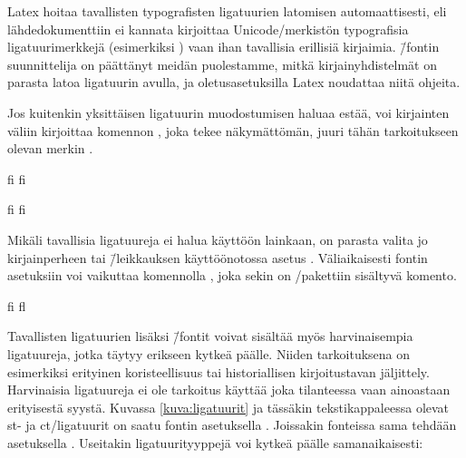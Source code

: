 Latex hoitaa tavallisten typografisten ligatuurien latomisen
automaattisesti, eli lähdedokumenttiin ei kannata kirjoittaa
Unicode\-/merkistön typografisia ligatuurimerkkejä (esimerkiksi
) vaan ihan tavallisia
erillisiä kirjaimia.  \=/fontin suunnittelija on
päättänyt meidän puolestamme, mitkä kirjainyhdistelmät on parasta latoa
ligatuurin avulla, ja oletusasetuksilla Latex noudattaa niitä ohjeita.

Jos kuitenkin yksittäisen ligatuurin muodostumisen haluaa estää, voi
kirjainten väliin kirjoittaa komennon , joka
tekee näkymättömän, juuri tähän tarkoitukseen olevan merkin
.

\begin{koodilohkosis}
  fi f\textcompwordmark i
\end{koodilohkosis}

\begin{tulossis}
  fi f\textcompwordmark i
\end{tulossis}

Mikäli tavallisia ligatuureja ei halua käyttöön lainkaan, on parasta
valita jo kirjainperheen tai \=/leikkauksen käyttöönotossa asetus
. Väliaikaisesti fontin asetuksiin
voi vaikuttaa komennolla , joka sekin on
\-/pakettiin sisältyvä komento.

\begin{koodilohkosis}
  { fi fl}
\end{koodilohkosis}

Tavallisten ligatuurien lisäksi  \=/fontit voivat
sisältää myös harvinaisempia ligatuureja, jotka täytyy erikseen kytkeä
päälle. Niiden tarkoituksena on esimerkiksi erityinen koristeellisuus
tai historiallisen kirjoitustavan jäljittely. Harvinaisia ligatuureja ei
ole tarkoitus käyttää joka tilanteessa vaan ainoastaan erityisestä
syystä. Kuvassa \ref{kuva:ligatuurit} ja tässäkin tekstikappaleessa
olevat {%
  \newcommand{\hlig}[1]{{\erikoisfontti
      #1}}%
  \hlig{st}- ja \hlig{ct}\-/ligatuurit%
} on saatu fontin asetuksella .
Joissakin fonteissa sama tehdään asetuksella . Useitakin ligatuurityyppejä voi kytkeä päälle
samanaikaisesti:

